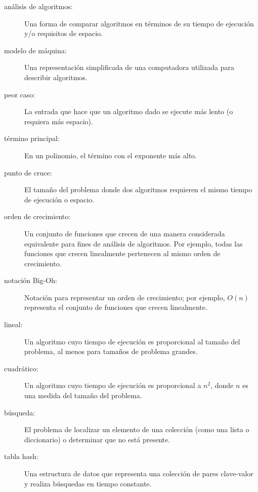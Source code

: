 \begin{description}
    \item[análisis de algoritmos:] Una forma de comparar algoritmos en términos de su tiempo de ejecución y/o requisitos de espacio.
    \item[modelo de máquina:] Una representación simplificada de una computadora utilizada para describir algoritmos.
    \item[peor caso:] La entrada que hace que un algoritmo dado se ejecute más lento (o requiera más espacio).
    \item[término principal:] En un polinomio, el término con el exponente más alto.
    \item[punto de cruce:] El tamaño del problema donde dos algoritmos requieren el mismo tiempo de ejecución o espacio.
    \item[orden de crecimiento:] Un conjunto de funciones que crecen de una manera considerada equivalente para fines de análisis de algoritmos. Por ejemplo, todas las funciones que crecen linealmente pertenecen al mismo orden de crecimiento.
    \item[notación Big-Oh:] Notación para representar un orden de crecimiento; por ejemplo, \( O(n) \) representa el conjunto de funciones que crecen linealmente.
    \item[lineal:] Un algoritmo cuyo tiempo de ejecución es proporcional al tamaño del problema, al menos para tamaños de problema grandes.
    \item[cuadrático:] Un algoritmo cuyo tiempo de ejecución es proporcional a \( n^2 \), donde \( n \) es una medida del tamaño del problema.
    \item[búsqueda:] El problema de localizar un elemento de una colección (como una lista o diccionario) o determinar que no está presente.
    \item[tabla hash:] Una estructura de datos que representa una colección de pares clave-valor y realiza búsquedas en tiempo constante.
\end{description}
